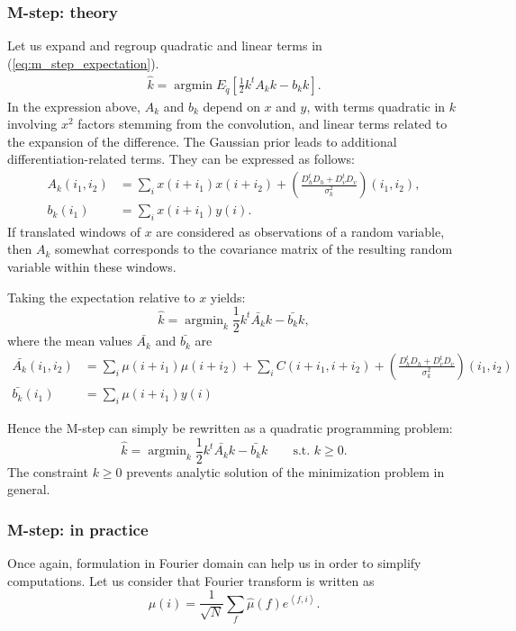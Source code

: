\documentclass[english,a4paper]{article}
\theoremstyle{plain}
\theoremstyle{definition}
\theoremstyle{remark}
\newcommand{\scal}[2]{\left\langle #1 , #2 \right\rangle}
\DeclareMathOperator*{\argmin}{argmin}
\begin{document}
\subsubsection{M-step: theory}

Let us expand and regroup quadratic and linear terms in (\ref{eq:m_step_expectation}).
\begin{align*}
\hat{k} = \argmin E_{\tilde{q}} \left[
\frac{1}{2} k^t A_k k - b_k k
\right].
\end{align*}
In the expression above, $A_k$ and $b_k$ depend on $x$ and $y$, with  terms quadratic in $k$ involving $x^2$ factors stemming from the convolution, and linear terms related to the expansion of the difference. The Gaussian prior leads to additional differentiation-related terms.
They can be expressed as follows:
\begin{align}
\label{eq:m_step_A_k}
A_k(i_1,i_2) &= \sum_i x(i+i_1) x(i+i_2) + \left(\frac{D_h^tD_h + D_v^tD_v}{\sigma_k^2} \right)(i_1,i_2) ,\\
\label{eq:m_step_b_k}
b_k(i_1) &= \sum_i x(i+i_1) y(i) .
\end{align}
If translated windows of $x$ are considered as observations of a random variable, then $A_k$ somewhat corresponds to the covariance matrix of the resulting random variable within these windows.

Taking the expectation relative to $x$ yields:
\begin{equation}\label{eq:m_step_quadratic}
\hat{k} = \argmin_k \frac{1}{2} k^t \bar{A_k} k - \bar{b_k} k,
\end{equation}
where the mean values $ \bar{A_k}$ and $ \bar{b_k}$ are
\begin{align}
\bar{A_k}(i_1,i_2)  &= \sum_i \mu(i+i_1)\mu(i+i_2) + \sum_i C(i+i_1,i+i_2) + \left(\frac{D_h^tD_h + D_v^tD_v}{\sigma_k^2} \right)(i_1,i_2) \\
\bar{b_k}(i_1) &= \sum_i \mu(i+i_1) y(i)
\end{align}

Hence the M-step can simply be rewritten as a quadratic programming problem:
\begin{equation}
\hat{k} = \argmin_k \frac{1}{2} k^t \bar{A_k} k - \bar{b_k} k \quad \quad \text{s.t. } k\ge 0 .
\end{equation}
The constraint $k\ge 0$ prevents analytic solution of the minimization problem in general.

\subsubsection{M-step: in practice}
Once again, formulation in Fourier domain can help us in order to simplify computations.
Let us consider that Fourier transform is written as
\begin{equation}\label{eq:fourier_mu}
\mu(i) = \frac{1}{\sqrt{N}} \sum_{f} \hat{\mu}(f) e^{\scal{f}{i}}.
\end{equation}
\end{document}
